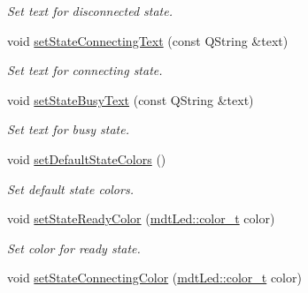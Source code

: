 \begin{DoxyCompactItemize}
\begin{DoxyCompactList}\small\item\em Set text for disconnected state. \end{DoxyCompactList}\item 
\hypertarget{classmdt_device_status_widget_a446ab6546eaaa87f97adceb1ae551554}{
void \hyperlink{classmdt_device_status_widget_a446ab6546eaaa87f97adceb1ae551554}{setStateConnectingText} (const QString \&text)}
\label{classmdt_device_status_widget_a446ab6546eaaa87f97adceb1ae551554}

\begin{DoxyCompactList}\small\item\em Set text for connecting state. \end{DoxyCompactList}\item 
\hypertarget{classmdt_device_status_widget_aa4c289bdfe1f5a0062bc8f6a9dc58fff}{
void \hyperlink{classmdt_device_status_widget_aa4c289bdfe1f5a0062bc8f6a9dc58fff}{setStateBusyText} (const QString \&text)}
\label{classmdt_device_status_widget_aa4c289bdfe1f5a0062bc8f6a9dc58fff}

\begin{DoxyCompactList}\small\item\em Set text for busy state. \end{DoxyCompactList}\item 
\hypertarget{classmdt_device_status_widget_a4e3b964a75b11b9a5b938698cd719ac7}{
void \hyperlink{classmdt_device_status_widget_a4e3b964a75b11b9a5b938698cd719ac7}{setDefaultStateColors} ()}
\label{classmdt_device_status_widget_a4e3b964a75b11b9a5b938698cd719ac7}

\begin{DoxyCompactList}\small\item\em Set default state colors. \end{DoxyCompactList}\item 
\hypertarget{classmdt_device_status_widget_a0e8d845302a6c73a045e1392b5a549dd}{
void \hyperlink{classmdt_device_status_widget_a0e8d845302a6c73a045e1392b5a549dd}{setStateReadyColor} (\hyperlink{classmdt_led_a2d57d9ef04d2105d2fad93b57fc7cfef}{mdtLed::color\_\-t} color)}
\label{classmdt_device_status_widget_a0e8d845302a6c73a045e1392b5a549dd}

\begin{DoxyCompactList}\small\item\em Set color for ready state. \end{DoxyCompactList}\item 
\hypertarget{classmdt_device_status_widget_ad240144a1c2da47a3f826c1987343ab7}{
void \hyperlink{classmdt_device_status_widget_ad240144a1c2da47a3f826c1987343ab7}{setStateConnectingColor} (\hyperlink{classmdt_led_a2d57d9ef04d2105d2fad93b57fc7cfef}{mdtLed::color\_\-t} color)}
\label{classmdt_device_status_widget_ad240144a1c2da47a3f826c1987343ab7}


\end{DoxyCompactItemize}
